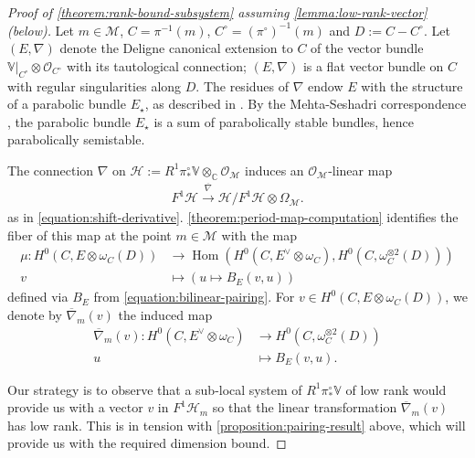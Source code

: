 \documentclass[12 pt]{amsart}
\theoremstyle{plain}
\theoremstyle{definition}
\theoremstyle{remark}
\numberwithin{equation}{section}
\DeclareMathOperator\Hom{Hom}
\begin{document}
\begin{proof}[Proof of \autoref{theorem:rank-bound-subsystem} assuming
	\autoref{lemma:low-rank-vector} (below)]
Let $m \in \mathscr{M}$, $C=\pi^{-1}(m)$, $C^\circ = (\pi^{\circ})^{-1}(m)$
and $D := C - C^\circ$.
Let $(E, \nabla)$ denote the
Deligne canonical extension
to $C$ of the vector bundle $\mathbb V|_{C^\circ} \otimes \mathscr O_{C^\circ}$ with its tautological connection; $(E,\nabla)$ is a flat vector bundle on $C$ with regular singularities along $D$. The residues of $\nabla$ endow $E$ with the structure of a parabolic bundle $E_\star$, as described in \cite[Definition 3.3.1]{LL:geometric-local-systems}.
By the Mehta-Seshadri correspondence \cite{mehta1980moduli},
the parabolic bundle $E_\star$ is a sum of parabolically stable bundles, hence
parabolically semistable. 

The connection $\nabla$ on $\mathscr{H} := R^1 \pi^\circ_*\mathbb V \otimes_{\mathbb C}
\mathscr O_{\mathscr M}$ induces an $\mathscr O_{\mathscr M}$-linear map
\begin{align*}
	F^1\mathscr{H} \xrightarrow{\overline{\nabla}} \mathscr{H}/F^1 \mathscr{H} \otimes \Omega_{\mathscr M}.
\end{align*}
as in \eqref{equation:shift-derivative}.
\autoref{theorem:period-map-computation} identifies the fiber of this map at the point $m \in \mathscr M$ with the map
\begin{align*}
	\mu: H^0(C, E \otimes \omega_C(D)) &\to \Hom(H^0(C, E^\vee \otimes \omega_C),
	H^0(C, \omega_C^{\otimes	2}(D))) \\
v&\mapsto (u\mapsto B_E(v, u)) \end{align*}
defined via $B_E$ from \eqref{equation:bilinear-pairing}. For $v\in H^0(C, E\otimes \omega_C(D))$, we denote by $\overline{\nabla}_m(v)$ the induced map 
\begin{align*}
 \overline{\nabla}_m(v): H^0(C, E^\vee \otimes \omega_C)& \rightarrow H^0(C, \omega_C^{\otimes	2}(D))\\
u & \mapsto B_E(v, u).
\end{align*}

Our strategy is to observe that a sub-local system of $R^1\pi_*^\circ \mathbb{V}$ of low rank would provide us with a vector $v$ in $F^1\mathscr{H}_m$ so that the linear transformation $\overline{\nabla}_m(v)$ has low rank. This is in tension with \autoref{proposition:pairing-result} above, which will provide us with the required dimension bound.


\end{proof}
\end{document}
